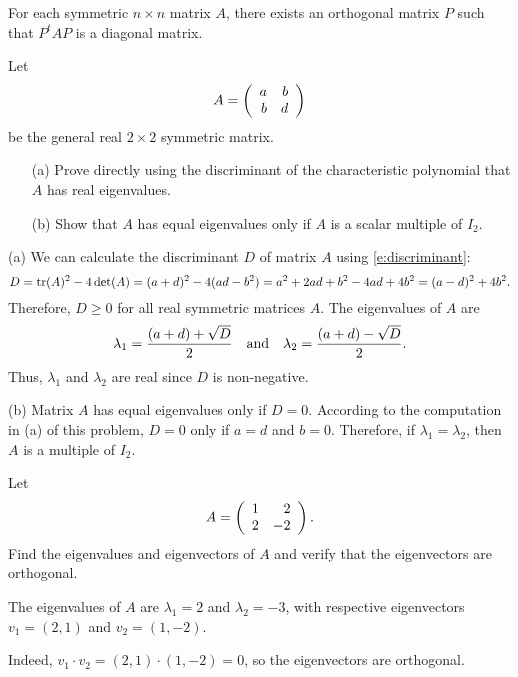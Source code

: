 \documentclass{ximera}
\begin{document}

\begin{proposition}  For each symmetric $n\times n$ matrix $A$, there exists an
orthogonal matrix $P$ such that $P^tAP$ is a diagonal matrix.
\end{proposition}



\EXER

\TEXER

\begin{exercise} \label{c7.7.1}
Let
\[
A = \left(\begin{array}{rr} a & b\\ b &d\end{array}\right)
\]
be the general real $2\times 2$ symmetric matrix.
\begin{itemize}
\item[(a)]  Prove directly using the discriminant of the characteristic
polynomial that $A$ has real eigenvalues.
\item[(b)]  Show that $A$ has equal eigenvalues only if $A$ is a scalar
multiple of $I_2$.
\end{itemize}

\begin{solution}

(a) We can calculate the discriminant $D$ of matrix $A$ using
\eqref{e:discriminant}:
\[ D = {\rm tr}(A)^2 - 4\det(A) = (a + d)^2 - 4(ad - b^2) =
a^2 + 2ad + b^2 - 4ad + 4b^2 = (a - d)^2 + 4b^2. \]
Therefore, $D \geq 0$ for all real symmetric matrices $A$.  The
eigenvalues of $A$ are
\[ \lambda_1 = \frac{(a + d) + \sqrt{D}}{2} \quad\mbox{and}\quad
\lambda_2 = \frac{(a + d) - \sqrt{D}}{2}. \]
Thus, $\lambda_1$ and $\lambda_2$ are real since $D$ is non-negative.

(b) Matrix $A$ has equal eigenvalues only if $D = 0$.  According to
the computation in (a) of this problem, $D = 0$ only if $a = d$ and
$b = 0$.  Therefore, if $\lambda_1 = \lambda_2$, then $A$ is a
multiple of $I_2$.

\end{solution}
\end{exercise}

\begin{exercise} \label{c7.7.2}
Let
\[
A=\left(\begin{array}{rr} 1 & 2\\ 2 &-2\end{array}\right).
\]
Find the eigenvalues and eigenvectors of $A$ and verify that the eigenvectors
are orthogonal.

\begin{solution}

\ans The eigenvalues of $A$ are $\lambda_1 = 2$ and $\lambda_2 = -3$,
with respective eigenvectors $v_1 = (2,1)$ and $v_2 = (1,-2)$.

\soln Indeed, $v_1 \cdot v_2 = (2,1) \cdot (1,-2) = 0$, so the
eigenvectors are orthogonal.

\end{solution}
\end{exercise}
\end{document}
